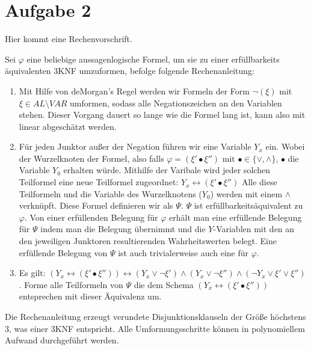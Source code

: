 \documentclass[a4paper,10pt]{article}
\begin{document}
\section*{Aufgabe 2}
	Hier kommt eine Rechenvorschrift.

	Sei $\varphi$ eine beliebige aussagenlogische Formel, um sie zu einer erfüllbarkeits
	\"aquivalenten 3KNF umzuformen, befolge folgende Rechenanleitung:
	\begin{enumerate}
		\item 	Mit Hilfe von deMorgan's Regel werden wir Formeln der Form 
			$\lnot(\xi)$ mit $\xi \in AL\setminus VAR$ umformen, sodass alle 
			Negationszeichen an den Variablen stehen. 
			Dieser Vorgang dauert so lange wie die Formel lang ist, kann also mit
			linear abgeschätzt werden.
		\item   Für jeden Junktor außer der Negation führen wir eine 
			Variable $Y_x$ ein. Wobei der Wurzelknoten der Formel, also falls 
			$\varphi = (\xi' \bullet \xi'') \text{ mit } \bullet \in \{\lor, \land\}$, 
			$\bullet$ die Variable 
			$Y_0$ erhalten würde. Mithilfe der Varibale wird jeder solchen Teilformel 
			eine neue Teilformel zugeordnet: 
			$Y_x \leftrightarrow (\xi' \bullet \xi'')$
			Alle diese Teilformeln und die Variable des Wurzelknotens ($Y_0$) werden mit einem $\land$ verknüpft. Diese 
			Formel definieren wir als $\Psi$. 
			$\Psi$ ist erfüllbarkeitsäquivalent zu 
			$\varphi$. Von einer erfüllenden Belegung für $\varphi$ erhält 
			man eine erfüllende Belegung für $\Psi$ indem man die Belegung 
			übernimmt und die $Y$-Variablen mit den an den jeweiligen Junktoren 
			resultierenden Wahrheitswerten belegt. Eine erfüllende Belegung von 
			$\Psi$ ist auch trivialerweise auch eine für $\varphi$.
		\item	Es gilt: $(Y_x \leftrightarrow (\xi' \bullet \xi'')) 
			\leftrightarrow (Y_x \lor \lnot \xi') \land (Y_x \lor \lnot \xi'') 				\land (\lnot Y_x \lor \xi' \lor \xi'')$. Forme alle Teilformeln von $\Psi$ die dem Schema $(Y_x \leftrightarrow (\xi' \bullet \xi'')) $ entsprechen mit dieser Äquivalenz um.
		\end{enumerate}
Die Rechenanleitung erzeugt verundete Disjunktionsklauseln der Größe höchstens 3, was einer 3KNF entspricht. Alle Umformungsschritte können in polynomiellem Aufwand durchgeführt werden.
			
	
\end{document}
